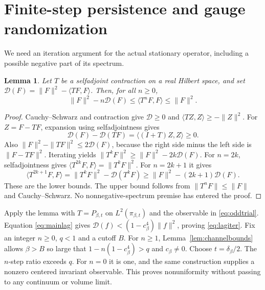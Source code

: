 \documentclass[11pt]{article}
\newtheorem{lemma}[theorem]{Lemma}
\begin{document}
\section{Finite-step persistence and gauge randomization}
We need an iteration argument for the actual stationary operator,
including a possible negative part of its spectrum.

\begin{lemma}\label{lem:iteration}
Let $T$ be a selfadjoint contraction on a real Hilbert space, and set
$\mathcal D(F)=\|F\|^2-\langle TF,F\rangle$. Then, for all $n\geq0$,
\begin{equation}\label{eq:Hilbertiteration}
 \|F\|^2-n\mathcal D(F)\leq\langle T^nF,F\rangle\leq\|F\|^2.
\end{equation}
\end{lemma}
\begin{proof}
Cauchy--Schwarz and contraction give $\mathcal D\geq0$ and
$\langle TZ,Z\rangle\geq-\|Z\|^2$.
For $Z=F-TF$, expansion using selfadjointness gives
\[
 \mathcal D(F)-\mathcal D(TF)
 =\langle (I+T)Z,Z\rangle\geq0.
\]
Also $\|F\|^2-\|TF\|^2\leq2\mathcal D(F)$, because the right
side minus the left side is $\|F-TF\|^2$.
Iterating yields $\|T^kF\|^2\geq\|F\|^2-2k\mathcal D(F)$.
For $n=2k$, selfadjointness gives
$\langle T^{2k}F,F\rangle=\|T^kF\|^2$.
For $n=2k+1$ it gives
\[
 \langle T^{2k+1}F,F\rangle
 =\|T^kF\|^2-\mathcal D(T^kF)
 \geq\|F\|^2-(2k+1)\mathcal D(F).
\]
These are the lower bounds. The upper bound follows from
$\|T^nF\|\leq\|F\|$ and Cauchy--Schwarz. No nonnegative-spectrum
premise has entered the proof.
\end{proof}

Apply the lemma with $T=P_{\beta,t}$ on $L^2(\pi_{\beta,t})$ and
the observable in \eqref{eq:oddtrial}. Equation \eqref{eq:mainlag}
gives $\mathcal D(f)<(1-c_\beta^4)\|f\|^2$, proving
\eqref{eq:lagiter}. Fix an integer $n\geq0$, $q<1$ and a cutoff $B$.
For $n\geq1$, Lemma~\ref{lem:channelbounds} allows $\beta>B$
so large that $1-n(1-c_\beta^4)>q$ and $c_\beta\ne0$.
Choose $t=\delta_\beta/2$. The $n$-step ratio exceeds $q$.
For $n=0$ it is one, and the same construction supplies a nonzero
centered invariant observable. This proves nonuniformity without
passing to any continuum or volume limit.
\end{document}

